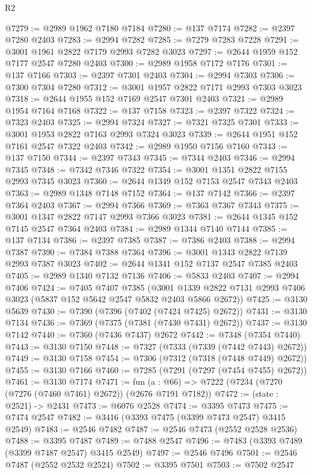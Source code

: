 \begin{lexlean}{R2}
\begin{coremodule}
@7279 := @2989 @1962 @7180 @7184
@7280 := @137 @7174
@7282 := @2397 @7280 @2403
@7283 := @2994 @7282
@7285 := @7279 @7283 @7228
@7291 := @3001 @1961 @2822 @7179 @2993 @7282 @3023
@7297 := @2644 @1959 @152 @7177 @2547 @7280 @2403
@7300 := @2989 @1958 @7172 @7176
@7301 := @137 @7166
@7303 := @2397 @7301 @2403
@7304 := @2994 @7303
@7306 := @7300 @7304 @7280
@7312 := @3001 @1957 @2822 @7171 @2993 @7303 @3023
@7318 := @2644 @1955 @152 @7169 @2547 @7301 @2403
@7321 := @2989 @1954 @7164 @7168
@7322 := @137 @7158
@7323 := @2397 @7322
@7324 := @7323 @2403
@7325 := @2994 @7324
@7327 := @7321 @7325 @7301
@7333 := @3001 @1953 @2822 @7163 @2993 @7324 @3023
@7339 := @2644 @1951 @152 @7161 @2547 @7322 @2403
@7342 := @2989 @1950 @7156 @7160
@7343 := @137 @7150
@7344 := @2397 @7343
@7345 := @7344 @2403
@7346 := @2994 @7345
@7348 := @7342 @7346 @7322
@7354 := @3001 @1351 @2822 @7155 @2993 @7345 @3023
@7360 := @2644 @1349 @152 @7153 @2547 @7343 @2403
@7363 := @2989 @1348 @7148 @7152
@7364 := @137 @7142
@7366 := @2397 @7364 @2403
@7367 := @2994 @7366
@7369 := @7363 @7367 @7343
@7375 := @3001 @1347 @2822 @7147 @2993 @7366 @3023
@7381 := @2644 @1345 @152 @7145 @2547 @7364 @2403
@7384 := @2989 @1344 @7140 @7144
@7385 := @137 @7134
@7386 := @2397 @7385
@7387 := @7386 @2403
@7388 := @2994 @7387
@7390 := @7384 @7388 @7364
@7396 := @3001 @1343 @2822 @7139 @2993 @7387 @3023
@7402 := @2644 @1341 @152 @7137 @2547 @7385 @2403
@7405 := @2989 @1340 @7132 @7136
@7406 := @5833 @2403
@7407 := @2994 @7406
@7424 := @7405
    @7407
    @7385
    (@3001 @1339 @2822 @7131 @2993 @7406 @3023 (@5837 @152 @5642 @2547 @5832 @2403 @5866 @2672))
@7425 := @3130 @5639
@7430 := @7390 (@7396 (@7402 (@7424 @7425) @2672))
@7431 := @3130 @7134
@7436 := @7369 (@7375 (@7381 (@7430 @7431) @2672))
@7437 := @3130 @7142
@7440 := @7360 (@7436 @7437) @2672
@7442 := @7348 (@7354 @7440)
@7443 := @3130 @7150
@7448 := @7327 (@7333 (@7339 (@7442 @7443) @2672))
@7449 := @3130 @7158
@7454 := @7306 (@7312 (@7318 (@7448 @7449) @2672))
@7455 := @3130 @7166
@7460 := @7285 (@7291 (@7297 (@7454 @7455) @2672))
@7461 := @3130 @7174
@7471 := fun (a : @66) => @7222 (@7234 (@7270 (@7276 (@7460 @7461) @2672)) (@2676 @7191 @7182))
@7472 := (state : @2521) -> @2431
@7473 := @6076 @2528
@7474 := @3395 @7473
@7475 := @7474 @2547
@7482 := @3416 (@3393 @7475 (@3399 @7473 @2547) @3415 @2549)
@7483 := @2546 @7482
@7487 := @2546 @7473 (@2552 @2528 @2536)
@7488 := @3395 @7487
@7489 := @7488 @2547
@7496 := @7483 (@3393 @7489 (@3399 @7487 @2547) @3415 @2549)
@7497 := @2546 @7496
@7501 := @2546 @7487 (@2552 @2532 @2524)
@7502 := @3395 @7501
@7503 := @7502 @2547

\end{coremodule}
\end{lexlean}
